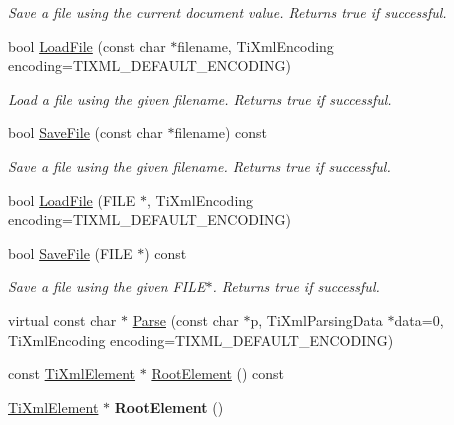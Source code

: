 \begin{DoxyCompactItemize}
\begin{DoxyCompactList}\small\item\em Save a file using the current document value. Returns true if successful. \end{DoxyCompactList}\item 
\hypertarget{class_ti_xml_document_a879cdf5e981b8b2d2ef82f2546dd28fb}{bool \hyperlink{class_ti_xml_document_a879cdf5e981b8b2d2ef82f2546dd28fb}{Load\-File} (const char $\ast$filename, Ti\-Xml\-Encoding encoding=T\-I\-X\-M\-L\-\_\-\-D\-E\-F\-A\-U\-L\-T\-\_\-\-E\-N\-C\-O\-D\-I\-N\-G)}\label{class_ti_xml_document_a879cdf5e981b8b2d2ef82f2546dd28fb}

\begin{DoxyCompactList}\small\item\em Load a file using the given filename. Returns true if successful. \end{DoxyCompactList}\item 
\hypertarget{class_ti_xml_document_ae869f5ebf7fc54c4a1d737fb4689fd44}{bool \hyperlink{class_ti_xml_document_ae869f5ebf7fc54c4a1d737fb4689fd44}{Save\-File} (const char $\ast$filename) const }\label{class_ti_xml_document_ae869f5ebf7fc54c4a1d737fb4689fd44}

\begin{DoxyCompactList}\small\item\em Save a file using the given filename. Returns true if successful. \end{DoxyCompactList}\item 
bool \hyperlink{class_ti_xml_document_a41f6fe7200864d1dca663d230caf8db6}{Load\-File} (F\-I\-L\-E $\ast$, Ti\-Xml\-Encoding encoding=T\-I\-X\-M\-L\-\_\-\-D\-E\-F\-A\-U\-L\-T\-\_\-\-E\-N\-C\-O\-D\-I\-N\-G)
\item 
\hypertarget{class_ti_xml_document_acf1672b4538c6d1d441f9f108aea2bf4}{bool \hyperlink{class_ti_xml_document_acf1672b4538c6d1d441f9f108aea2bf4}{Save\-File} (F\-I\-L\-E $\ast$) const }\label{class_ti_xml_document_acf1672b4538c6d1d441f9f108aea2bf4}

\begin{DoxyCompactList}\small\item\em Save a file using the given F\-I\-L\-E$\ast$. Returns true if successful. \end{DoxyCompactList}\item 
virtual const char $\ast$ \hyperlink{class_ti_xml_document_a17ebabe36926ef398e78dec0d0ad0378}{Parse} (const char $\ast$p, Ti\-Xml\-Parsing\-Data $\ast$data=0, Ti\-Xml\-Encoding encoding=T\-I\-X\-M\-L\-\_\-\-D\-E\-F\-A\-U\-L\-T\-\_\-\-E\-N\-C\-O\-D\-I\-N\-G)
\item 
const \hyperlink{class_ti_xml_element}{Ti\-Xml\-Element} $\ast$ \hyperlink{class_ti_xml_document_ad09d17927f908f40efb406af2fb873be}{Root\-Element} () const 
\item 
\hypertarget{class_ti_xml_document_a0b43e762a23f938b06651bc90b8a1013}{\hyperlink{class_ti_xml_element}{Ti\-Xml\-Element} $\ast$ {\bfseries Root\-Element} ()}\label{class_ti_xml_document_a0b43e762a23f938b06651bc90b8a1013}


\end{DoxyCompactItemize}
